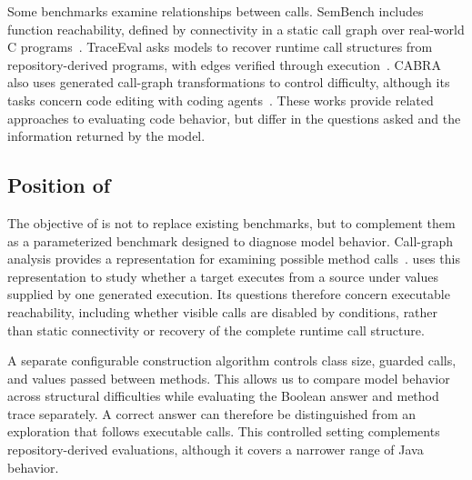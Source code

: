 Some benchmarks examine relationships between calls. SemBench includes function reachability, defined by connectivity in a static call graph over real-world C programs~\cite{xu2026semb}. TraceEval asks models to recover runtime call structures from repository-derived programs, with edges verified through execution~\cite{li2026traceeval}. CABRA also uses generated call-graph transformations to control difficulty, although its tasks concern code editing with coding agents~\cite{balepur2026cabra}. These works provide related approaches to evaluating code behavior, but differ in the questions asked and the information returned by the model.

\subsection{Position of \benchmark}

The objective of \benchmark is not to replace existing benchmarks, but to complement them as a parameterized benchmark designed to diagnose model behavior. Call-graph analysis provides a representation for examining possible method calls~\cite{grove2001framework,tip2000scalable}. \benchmark uses this representation to study whether a target executes from a source under values supplied by one generated execution. Its questions therefore concern executable reachability, including whether visible calls are disabled by conditions, rather than static connectivity or recovery of the complete runtime call structure.

A separate configurable construction algorithm controls class size, guarded calls, and values passed between methods. This allows us to compare model behavior across structural difficulties while evaluating the Boolean answer and method trace separately. A correct answer can therefore be distinguished from an exploration that follows executable calls. This controlled setting complements repository-derived evaluations, although it covers a narrower range of Java behavior.
